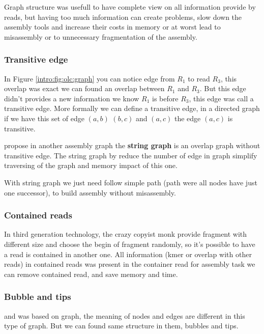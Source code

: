 \documentclass[./main.tex]{subfiles}
\begin{document}
Graph structure was usefull to have complete view on all information provide by reads, but having too much information can create problems, slow down the assembly tools and increase their costs in memory or at worst lead to misassembly or to unnecessary fragmentation of the assembly.

\subsubsection{Transitive edge}

In Figure \ref{intro:fig:olc:graph} you can notice edge from $R_1$ to read $R_3$, this overlap was exact we can found an overlap between $R_1$ and $R_3$. But this edge didn't provides a new information we know $R_1$ is before $R_3$, this edge was call a transitive edge. More formally we can define a transitive edge, in a directed graph if we have this set of edge $(a, b)$ $(b, c)$ and $(a, c)$ the edge $(a, c)$ is transitive.

\citeauthor{string_graph} propose in \cite{string_graph} another assembly graph the \textbf{string graph} is an overlap graph without transitive edge. The string graph by reduce the number of edge in graph simplify traversing of the graph and memory impact of this one.

With string graph we just need follow simple path (path were all nodes have just one successor), to build assembly without misassembly.

\subsubsection{Contained reads}

In third generation technology, the crazy copyist monk provide fragment with different size and choose the begin of fragment randomly, so it's possible to have a read is contained in another one. All information (kmer or overlap with other reads) in contained reads was present in the container read for assembly task we can remove contained read, and save memory and time.

\subsubsection{Bubble and tips}

\OLC and \DBG was based on graph, the meaning of nodes and edges are different in this type of graph. But we can found same structure in them, bubbles and tips.
\end{document}
